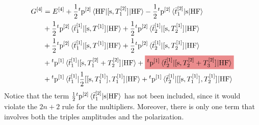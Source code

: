 \begin{equation}
  \begin{aligned}
  G^{[4]}
  &= E^{[4]}
    + \frac{1}{2}{}^t\p^{[2]}
      \braket{\mathrm{HF} | \commutator{\s}{T_1^{[2]}} | \mathrm{HF}}
    - \frac{1}{2}{}^t\p^{[2]}
       \braket{\tbar{1}^{[2]}| \s | \mathrm{HF}} \\
    &+ \frac{1}{2}{}^t\p^{[2]}
      \braket{\tbar{1}^{[1]}| \commutator{\s}{T^{[1]}} | \mathrm{HF} }
    + \frac{1}{2}{}^t\p^{[2]}
       \braket{\tbar{2}^{[1]}| \commutator{\s}{T_2^{[1]}} | \mathrm{HF} } \\
    &+ \frac{1}{2}{}^t\p^{[2]}\braket{\tbar{1}^{[1]}| \commutator{\s}{T^{[1]}} | \mathrm{HF} }
    + \frac{1}{2}{}^t\p^{[2]}\braket{\tbar{2}^{[1]}| \commutator{\s}{T_2^{[1]}} | \mathrm{HF} } \\
    &+
    {}^t\p^{[1]}
    \braket{\tbar{1}^{[1]} | \commutator{\s}{T_1^{[2]} + T_2^{[2]}} | \mathrm{HF}}
    +
    \highlight{brewerRed}{
    {}^t\p^{[1]}
    \braket{\tbar{2}^{[1]} | \commutator{\s}{T_2^{[2]} + T_3^{[2]}} | \mathrm{HF}}
    }
    \\
    &+
    {}^t\p^{[1]}
    \braket{\tbar{1}^{[1]} |
    \frac{1}{2}
    \commutator{\commutator{\s}{T_1^{[1]}}}{T_1^{[1]}}
    |
    \mathrm{HF}}
    +
    {}^t\p^{[1]}
    \braket{\tbar{2}^{[1]} |
    \commutator{\commutator{\s}{T_1^{[1]}}}{T_2^{[1]}}
    |
    \mathrm{HF}}
  \end{aligned}
\end{equation}
Notice that the term $\frac{1}{2}{}^t\mathrm{p}^{[2]}\braket{\bar{t}_{1}^{[2]}| \mathrm{s} | \mathrm{HF}}$
has not been included, since it would violate the $2n+2$ rule for the
multipliers. Moreover, there is only one term that involves both the
triples amplitudes and the polarization.

